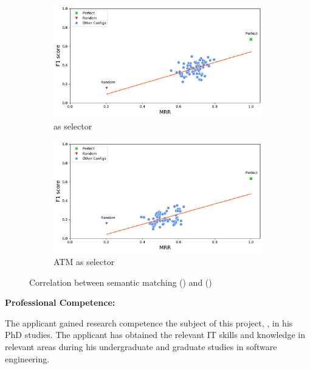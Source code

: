 \begin{figure}[H]
	\centering
	\begin{subfigure}{.5\textwidth}
		\centering
		\includegraphics[width=1\linewidth]{images/MRR_craftdroid_all_oracle_included.pdf}
		\caption{\craftdroid as selector}
		\label{fig:MRR_craftdroid_all_oracle_full}
	\end{subfigure}%
	\begin{subfigure}{.5\textwidth}
		\centering
		\includegraphics[width=1\linewidth]{images/MRR_atm_atm_oracle_included_passfree.pdf}
		\caption{ ATM as selector}
		\label{fig:MRR_atm_atm_oracle_passfree_full.pdf}
	\end{subfigure}
	\caption{Correlation between semantic matching (\mrr) and \testreuse (\fscore)}
	\label{fig:MRR-F1-scatter}
\end{figure}


\noindent
\textbf{Professional Competence:}

\noindent
The applicant gained research competence the subject of this project, \testreuse, in his PhD studies.
The applicant has obtained the relevant IT skills and knowledge in relevant areas during his undergraduate and graduate studies in software engineering.















